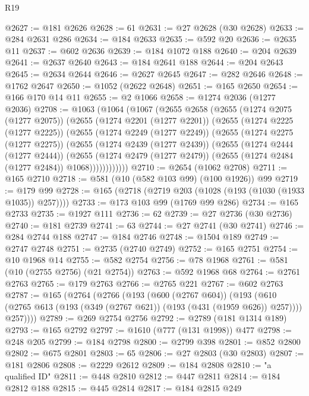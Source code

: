 \begin{lexlean}{R19}
\begin{coremodule}
@2627 := @181 @2626
@2628 := 61
@2631 := @27 @2628 (@30 @2628)
@2633 := @284 @2631 @286
@2634 := @184 @2633
@2635 := @592 @20
@2636 := @2635 @11
@2637 := @602 @2636
@2639 := @184 @1072 @188
@2640 := @204 @2639
@2641 := @2637 @2640
@2643 := @184 @2641 @188
@2644 := @204 @2643
@2645 := @2634 @2644
@2646 := @2627 @2645
@2647 := @282 @2646
@2648 := @1762 @2647
@2650 := @1052 (@2622 @2648)
@2651 := @165 @2650
@2654 := @166 @170 @14 @11
@2655 := @2 @1066
@2658 := @1274 @2036 (@1277 @2036)
@2708 := @1063
    (@1064
      (@1067
        (@2655
          @2658
          (@2655
            (@1274 @2075 (@1277 @2075))
            (@2655
              (@1274 @2201 (@1277 @2201))
              (@2655
                (@1274 @2225 (@1277 @2225))
                (@2655
                  (@1274 @2249 (@1277 @2249))
                  (@2655
                    (@1274 @2275 (@1277 @2275))
                    (@2655
                      (@1274 @2439 (@1277 @2439))
                      (@2655
                        (@1274 @2444 (@1277 @2444))
                        (@2655
                          (@1274 @2479 (@1277 @2479))
                          (@2655 (@1274 @2484 (@1277 @2484)) @1068))))))))))))
@2710 := @2654 (@1062 @2708)
@2711 := @165 @2710
@2718 := @581 (@10 (@582 @103 @99) (@100 @1926)) @99
@2719 := @179 @99
@2728 := @165 (@2718 (@2719 @203 (@1028 (@193 (@1030 (@1933 @1035)) @257))))
@2733 := @173 @103 @99 (@1769 @99 @286)
@2734 := @165 @2733
@2735 := @1927 @111
@2736 := 62
@2739 := @27 @2736 (@30 @2736)
@2740 := @181 @2739
@2741 := 63
@2744 := @27 @2741 (@30 @2741)
@2746 := @284 @2744 @188
@2747 := @184 @2746
@2748 := @1504 @189
@2749 := @2747 @2748
@2751 := @2735 (@2740 @2749)
@2752 := @165 @2751
@2754 := @10 @1968 @14
@2755 := @582 @2754
@2756 := @78 @1968
@2761 := @581 (@10 (@2755 @2756) (@21 @2754))
@2763 := @592 @1968 @68
@2764 := @2761 @2763
@2765 := @179 @2763
@2766 := @2765 @221
@2767 := @602 @2763
@2787 := @165
    (@2764
      (@2766
        (@193
          (@600 (@2767 @604))
          (@193
            (@610 (@2765 @613 (@193 (@349 (@2767 @621)) (@193 (@431 (@1959 @626)) @257))))
            @257))))
@2789 := @269 @2754 @2756
@2792 := @2789 (@181 @1314 @189)
@2793 := @165 @2792
@2797 := @1610 (@777 (@131 @1998)) @477
@2798 := @248 @205
@2799 := @184 @2798
@2800 := @2799 @398
@2801 := @852 @2800
@2802 := @675 @2801
@2803 := 65
@2806 := @27 @2803 (@30 @2803)
@2807 := @181 @2806
@2808 := @2229 @2612
@2809 := @184 @2808
@2810 := "a qualified ID"
@2811 := @448 @2810
@2812 := @447 @2811
@2814 := @184 @2812 @188
@2815 := @445 @2814
@2817 := @184 @2815 @249

\end{coremodule}
\end{lexlean}
